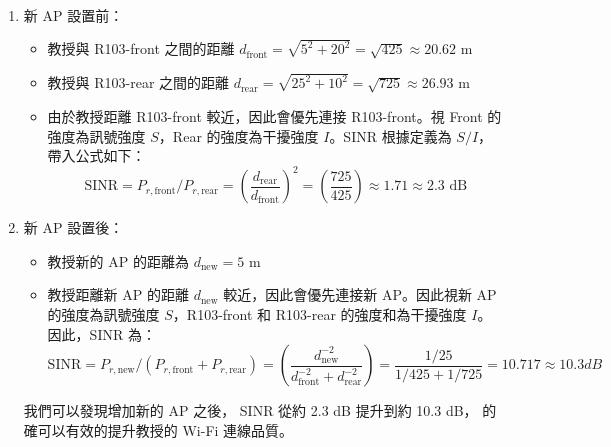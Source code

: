 \documentclass[12pt]{article}
\newenvironment{problem}[2][Problem]{\begin{trivlist}
\item[\hskip \labelsep {\bfseries #1}\hskip \labelsep {\bfseries #2}]}{\end{trivlist}}
\begin{document}
\begin{problem}{3.} 　
  \begin{enumerate}[label=(\alph*)]
    \item 新 AP 設置前：
      \begin{itemize}
        \item 教授與 R103-front 之間的距離 $d_\text{front} = \sqrt{5^2 + 20^2} = \sqrt{425} \approx 20.62$ m 
        \item 教授與 R103-rear 之間的距離 $d_\text{rear} = \sqrt{25^2 + 10^2} = \sqrt{725} \approx 26.93$ m
        \item 由於教授距離 R103-front 較近，因此會優先連接 R103-front。視 Front 的強度為訊號強度 $S$，Rear 的強度為干擾強度 $I$。SINR 根據定義為 $S/I$，帶入公式如下：
        \[
          \text{SINR} = P_{r, \text{front}} / P_{r, \text{rear}} = (\frac{d_\text{rear}}{d_\text{front}})^2 = (\frac{725}{425}) \approx 1.71 \approx 2.3 \text{ dB}
        \]
      \end{itemize}
    \item 新 AP 設置後：
      \begin{itemize}
        \item 教授新的 AP 的距離為 $d_\text{new} = 5$ m
        \item 教授距離新 AP 的距離 $d_\text{new}$ 較近，因此會優先連接新 AP。因此視新 AP 的強度為訊號強度 $S$，R103-front 和 R103-rear 的強度和為干擾強度 $I$。因此，SINR 為：
        \[
          \text{SINR} = P_{r, \text{new}} / (P_{r, \text{front}} + P_{r, \text{rear}}) = (\frac{d_\text{new}^{-2}}{d_\text{front}^{-2} + d_\text{rear}^{-2}}) = \frac{1/25}{1/425 + 1/725} = 10.717 \approx 10.3 dB
        \]
      \end{itemize}
      我們可以發現增加新的 AP 之後， SINR 從約 2.3 dB 提升到約 10.3 dB，
      的確可以有效的提升教授的 Wi-Fi 連線品質。
  \end{enumerate}
\end{problem}

\end{document}
